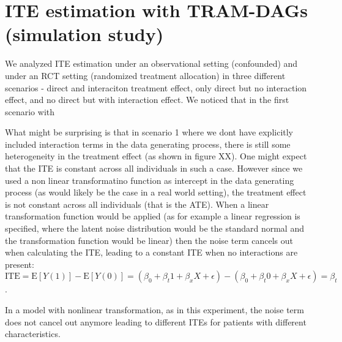 

\section{ITE estimation with TRAM-DAGs (simulation study)}

We analyzed ITE estimation under an observational setting (confounded) and under an RCT setting (randomized treatment allocation) in three different scenarios - direct and interaciton treatment effect, only direct but no interaction effect, and no direct but with interaction effect. We noticed that in the first scenario with 


What might be surprising is that in scenario 1 where we dont have explicitly included interaction terms in the data generating process, there is still some heterogeneity in the treatment effect (as shown in figure XX). One might expect that the ITE is constant across all individuals in such a case. However since we used a non linear transformatino function as intercept in the data generating process (as would likely be the case in a real world setting), the treatment effect is not constant across all individuals (that is the ATE). When a linear transformation function would be applied (as for example a linear regression is specified, where the latent noise distribution would be the standard normal and the transformation function would be linear) then the noise term cancels out when calculating the ITE, leading to a constant ITE when no interactions are present: $\text{ITE} = \text{E}[Y(1)] -\text{E}[Y(0)] = (\beta_0 + \beta_t 1 + \beta_x X + \epsilon) - (\beta_0 + \beta_t 0 + \beta_x X + \epsilon) = \beta_t$.

In a model with nonlinear transformation, as in this experiment, the noise term does not cancel out anymore leading to different ITEs for patients with different characteristics.

